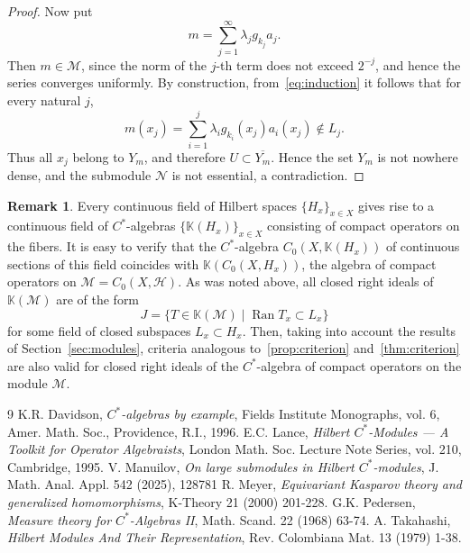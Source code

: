 \documentclass[reqno,a4paper,12pt]{amsart}
\theoremstyle{plain}
\theoremstyle{definition}
\newtheorem*{remark}{Remark}
\newcommand{\KK}{\mathbb K}
\newcommand{\M}{\mathcal M}
\newcommand{\N}{\mathcal N}
\begin{document}
\begin{proof}
		Now put
		\[ m = \sum_{j=1}^\infty \lambda_j g_{k_j}a_j. \]
		Then $m \in \M$, since the norm of the $j$-th term does not exceed $2^{-j}$, and hence the series converges uniformly.
		By construction, from~\eqref{eq:induction} it follows that for every natural $j$,
		\[ m(x_j) = \sum_{i=1}^j\lambda_ig_{k_i}(x_j)a_i(x_j) \notin L_j. \]
		Thus all $x_j$ belong to $Y_m$, and therefore $U \subset \overline{Y_m}$.
		Hence the set $Y_m$ is not nowhere dense, and the submodule $\N$ is not essential, a contradiction.
	\end{proof}
	
	\begin{remark}    
		Every continuous field of Hilbert spaces $\{H_x\}_{x \in X}$ gives rise to a continuous field of $C^*$-algebras $\{\KK(H_x)\}_{x \in X}$ consisting of compact operators on the fibers.
		It is easy to verify that the $C^*$-algebra $C_0(X, \KK(H_x))$ of continuous sections of this field coincides with $\KK(C_0(X, H_x))$, the algebra of compact operators on $\M = C_0(X, \mathcal H)$.
		As was noted above, all closed right ideals of $\KK(\M)$ are of the form
		\[ J = \{T \in \KK(\M) \mid \operatorname{Ran} T_x \subset L_x\} \]
		for some field of closed subspaces $L_x \subset H_x$.
		Then, taking into account the results of Section~\ref{sec:modules}, criteria analogous to~\ref{prop:criterion} and~\ref{thm:criterion} are also valid for closed right ideals of the $C^*$-algebra of compact operators on the module $\M$.
	\end{remark}
	
	\begin{thebibliography}{9}
		 K.R. Davidson,
		\textit{$C^*$-algebras by example},
		Fields Institute Monographs, vol. 6,
		Amer. Math. Soc., Providence, R.I., 1996.
		 E.C. Lance,
		\textit{Hilbert $C^*$-Modules — A Toolkit for Operator Algebraists},
		London Math. Soc. Lecture Note Series, vol. 210, Cambridge, 1995.
		 V. Manuilov,
		\textit{On large submodules in Hilbert $C^*$-modules},
		J. Math. Anal. Appl. 542 (2025), 128781
		 R. Meyer,
		\textit{Equivariant Kasparov theory and generalized homomorphisms},
		K-Theory 21 (2000) 201-228.
		 G.K. Pedersen,
		\textit{Measure theory for $C^*$-Algebras II},
		Math. Scand. 22 (1968) 63-74.
		 A. Takahashi,
		\textit{Hilbert Modules And Their Representation},
		Rev. Colombiana Mat. 13 (1979) 1-38.
	\end{thebibliography}
	
\end{document}
